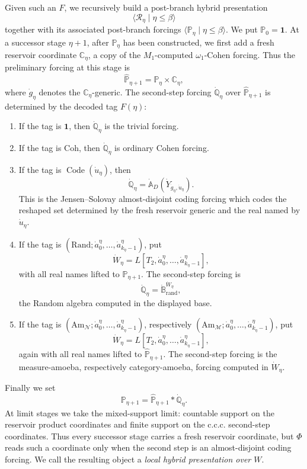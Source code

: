 \documentclass[a4paper,11pt]{article}
\begin{document}
Given such an \(F\), we recursively build a post-branch hybrid presentation
\[
   \langle \mathcal R_\eta\mid \eta\leq\beta\rangle
\]
together with its associated post-branch forcings
\(\langle\mathbb P_\eta\mid \eta\leq\beta\rangle\).  We put
\(\mathbb P_0=\mathbf 1\).  At a successor stage
\(\eta+1\), after \(\mathbb P_\eta\) has been constructed, we first add a fresh
reservoir coordinate \(\mathbb C_\eta\), a copy of the \(M_1\)-computed
\(\omega_1\)-Cohen forcing.  Thus the preliminary forcing at this stage is
\[
   \widehat{\mathbb P}_{\eta+1}=\mathbb P_\eta\times\mathbb C_\eta,
\]
where \(\dot g_\eta\) denotes the \(\mathbb C_\eta\)-generic.  The second-step
forcing \(\dot{\mathbb Q}_\eta\) over \(\widehat{\mathbb P}_{\eta+1}\) is
determined by the decoded tag \(F(\eta)\):
\begin{enumerate}
   \item If the tag is \(\mathbf 1\), then \(\dot{\mathbb Q}_\eta\) is the
   trivial forcing.

   \item If the tag is \(\mathrm{Coh}\), then \(\dot{\mathbb Q}_\eta\) is
   ordinary Cohen forcing.

   \item If the tag is \(\operatorname{Code}(\dot u_\eta)\), then
   \[
      \dot{\mathbb Q}_\eta
      =\dot{\mathbb A}_D(\dot Y_{\dot g_\eta,\dot u_\eta}).
   \]
   This is the Jensen--Solovay almost-disjoint coding forcing which codes the
   reshaped set determined by the fresh reservoir generic and the real named by
   \(\dot u_\eta\).

   \item If the tag is
   \((\mathrm{Rand};\dot a^\eta_0,\ldots,\dot a^\eta_{k_\eta-1})\), put
   \[
      \dot W_\eta=L[T_2,\dot a^\eta_0,\ldots,
         \dot a^\eta_{k_\eta-1}],
   \]
   with all real names lifted to \(\widehat{\mathbb P}_{\eta+1}\).  The
   second-step forcing is
   \[
      \dot{\mathbb Q}_\eta
      =\dot{\mathbb B}_{\mathrm{rand}}^{\dot W_\eta},
   \]
   the Random algebra computed in the displayed base.

   \item If the tag is
   \((\mathrm{Am}_{\mathcal N};\dot a^\eta_0,\ldots,
      \dot a^\eta_{k_\eta-1})\), respectively
   \((\mathrm{Am}_{\mathcal M};\dot a^\eta_0,\ldots,
      \dot a^\eta_{k_\eta-1})\), put
   \[
      \dot W_\eta=L[T_2,\dot a^\eta_0,\ldots,
         \dot a^\eta_{k_\eta-1}],
   \]
   again with all real names lifted to \(\widehat{\mathbb P}_{\eta+1}\).  The
   second-step forcing is the measure-amoeba, respectively category-amoeba,
   forcing computed in \(\dot W_\eta\).
\end{enumerate}
Finally we
set
\[
   \mathbb P_{\eta+1}=\widehat{\mathbb P}_{\eta+1}*\dot{\mathbb Q}_\eta.
\]
At limit stages we take the mixed-support limit: countable support on the
reservoir product coordinates and finite support on the c.c.c. second-step
coordinates.  Thus every successor stage carries a fresh reservoir coordinate,
but \(\Phi\) reads such a coordinate only when the second step is an
almost-disjoint coding forcing.  We call the resulting object a \emph{local
hybrid presentation over \(W\)}.
\end{document}
